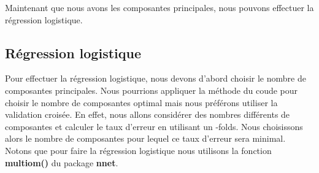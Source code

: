 \documentclass[12pt,a4paper]{article}
\begin{document}
Maintenant que nous avons les composantes principales, nous
pouvons effectuer la régression logistique.

\subsection{Régression logistique} 
Pour effectuer la régression logistique, nous devons d'abord choisir le nombre
de composantes principales. Nous pourrions appliquer la méthode du \og coude
\fg pour choisir le nombre de composantes optimal mais nous préférons utiliser
la validation croisée. En effet, nous allons considérer des nombres différents
de composantes et calculer le taux d'erreur en utilisant un -folds\fg.
Nous choisissons alors le nombre de composantes pour lequel ce taux d'erreur
sera minimal.\\
Notons que pour faire la régression logistique nous utilisons la fonction \textbf{multiom()} du package \textbf{nnet}.\vspace{2mm}
\end{document}
